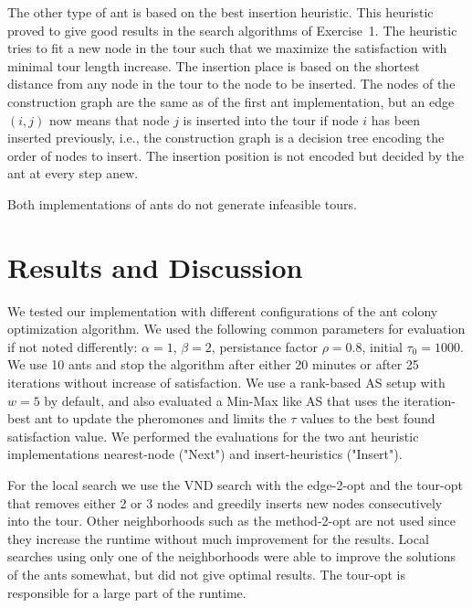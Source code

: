 \documentclass{article}
\begin{document}
The other type of ant is based on the best insertion heuristic. This heuristic proved to give good results in the search algorithms of Exercise~1. 
The heuristic tries to fit a new node in the tour such that we maximize the satisfaction with minimal tour length increase.
The insertion place is based on the shortest distance from any node in the tour to the node to be inserted.
The nodes of the construction graph are the same as of the first ant implementation, but an edge $(i,j)$ now means that node $j$ is inserted
into the tour if node $i$ has been inserted previously, i.e., the construction graph is a decision tree encoding the order of nodes to insert.
The insertion position is not encoded but decided by the ant at every step anew. 

Both implementations of ants do not generate infeasible tours.


\section{Results and Discussion}

We tested our implementation with different configurations of the ant colony optimization algorithm. We used the following common parameters
for evaluation if not noted differently: $\alpha = 1$, $\beta = 2$, persistance factor $\rho = 0.8$, initial $\tau_0 = 1000$. We use 10 ants
and stop the algorithm after either 20 minutes or after 25 iterations without increase of satisfaction. We use a rank-based AS setup with
$w=5$ by default, and also evaluated a Min-Max like AS that uses the iteration-best ant to update the pheromones and limits the $\tau$
values to the best found satisfaction value. We performed the evaluations for the two ant heuristic implementations nearest-node ("Next")
and insert-heuristics ("Insert").

For the local search we use the VND search with the edge-2-opt and the tour-opt that removes either 2 or 3 nodes and greedily inserts new nodes consecutively
into the tour. Other neighborhoods such as the method-2-opt are not used since they increase the runtime without much improvement for the
results. Local searches using only one of the neighborhoods were able to improve the solutions of the ants somewhat, but did not give
optimal results. The tour-opt is responsible for a large part of the runtime.
\end{document}
